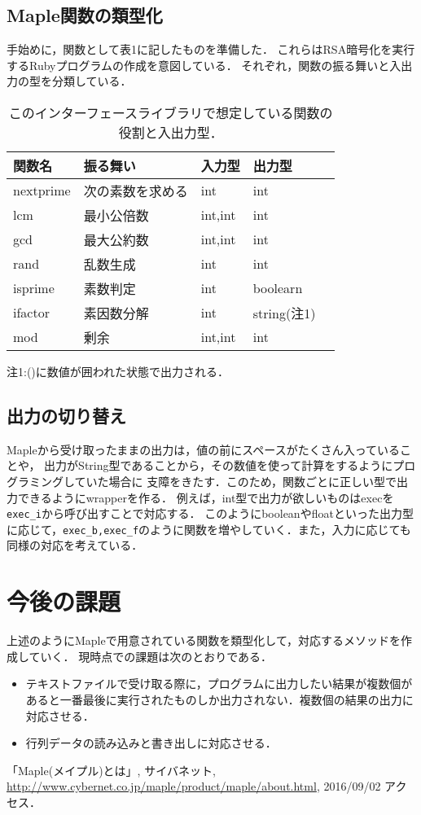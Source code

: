 \documentclass[10pt,a4j,twocolumn]{jsarticle}
\begin{document}
\subsection{Maple関数の類型化}
手始めに，関数として表1に記したものを準備した．
これらはRSA暗号化を実行するRubyプログラムの作成を意図している．
それぞれ，関数の振る舞いと入出力の型を分類している．
\begin{table}[htbp]\begin{center}
\caption{このインターフェースライブラリで想定している関数の役割と入出力型．}
\begin{tabular}{lllll}
\hline
関数名  &振る舞い  &入力型  &出力型  \\ \hline
nextprime  &次の素数を求める  &int  &int  \\
lcm  &最小公倍数  &int,int  &int  \\
gcd  &最大公約数  &int,int  &int  \\
rand  &乱数生成  &int  &int  \\
isprime  &素数判定  &int  &boolearn  \\
ifactor  &素因数分解  &int  &string{\footnotesize (注1)}  \\
mod  &剰余  &int,int  &int  \\
\hline
\end{tabular}
\end{center}
{\footnotesize 注1:()に数値が囲われた状態で出力される．}
\label{default}
\end{table}

\subsection{出力の切り替え}
Mapleから受け取ったままの出力は，値の前にスペースがたくさん入っていることや，
出力がString型であることから，その数値を使って計算をするようにプログラミングしていた場合に
支障をきたす．このため，関数ごとに正しい型で出力できるようにwrapperを作る．
例えば，int型で出力が欲しいものはexecを\verb|exec_i|から呼び出すことで対応する．
このようにbooleanやfloatといった出力型に応じて，\verb|exec_b,exec_f|のように関数を増やしていく．また，入力に応じても同様の対応を考えている．

\section{今後の課題}
上述のようにMapleで用意されている関数を類型化して，対応するメソッドを作成していく．
現時点での課題は次のとおりである．
\begin{itemize}
\item テキストファイルで受け取る際に，プログラムに出力したい結果が複数個があると一番最後に実行されたものしか出力されない．複数個の結果の出力に対応させる．
\item 行列データの読み込みと書き出しに対応させる．
\end{itemize}


\begin{thebibliography}{9}
「Maple(メイプル)とは」, サイバネット, \url{http://www.cybernet.co.jp/maple/product/maple/about.html}, 2016/09/02 アクセス．
\end{thebibliography}
\end{document}
